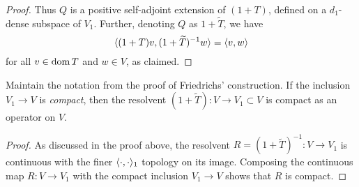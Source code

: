 \documentclass[11pt]{amsart}
\begin{document}
\begin{proof}
		Thus $Q$ is a positive self-adjoint extension of $(1+T)$, defined on a $d_1$-dense subspace of $V_1$. Further,  denoting $Q$ as $1+\tilde{T}$, we have
			\begin{equation*}
				\langle (1+T)v, (1+\widetilde{T})^{-1}w \rangle=\langle v, w \rangle
			\end{equation*}
		for all $v\in \operatorname{dom} T$ and $w\in V$, as claimed.
	\end{proof}
	\begin{claim}
		Maintain the notation from the proof of Friedrichs' construction. If the inclusion $V_1\to V$ is \emph{compact}, then the resolvent $(1+\tilde{T}):V\to V_1 \subset V$ is compact as an operator on $V$.
	\end{claim}
	\begin{proof}
		As discussed in the proof above, the resolvent $R=(1+\tilde{T})^{-1}:V\to V_1$ is continuous with the finer $\langle \cdot, \cdot \rangle_1$ topology on its image.  Composing the continuous map $R:V\to V_1$ with the compact inclusion $V_1\to V$ shows that $R$ is compact. 
	\end{proof}
\end{document}
